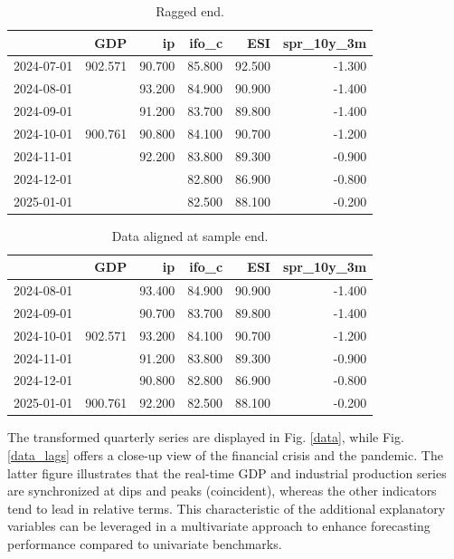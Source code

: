 \documentclass[a4paper]{article}
\begin{document}
\begin{table}[ht]
\centering
\begin{tabular}{rrrrrr}
  \hline
 & GDP & ip & ifo\_c & ESI & spr\_10y\_3m \\ 
  \hline
2024-07-01 & 902.571 & 90.700 & 85.800 & 92.500 & -1.300 \\ 
  2024-08-01 &  & 93.200 & 84.900 & 90.900 & -1.400 \\ 
  2024-09-01 &  & 91.200 & 83.700 & 89.800 & -1.400 \\ 
  2024-10-01 & 900.761 & 90.800 & 84.100 & 90.700 & -1.200 \\ 
  2024-11-01 &  & 92.200 & 83.800 & 89.300 & -0.900 \\ 
  2024-12-01 &  &  & 82.800 & 86.900 & -0.800 \\ 
  2025-01-01 &  &  & 82.500 & 88.100 & -0.200 \\ 
   \hline
\end{tabular}
\caption{Ragged end.  } 
\label{f_stat}
\end{table}%
\begin{table}[ht]
\centering
\begin{tabular}{rrrrrr}
  \hline
 & GDP & ip & ifo\_c & ESI & spr\_10y\_3m \\ 
  \hline
2024-08-01 &  & 93.400 & 84.900 & 90.900 & -1.400 \\ 
  2024-09-01 &  & 90.700 & 83.700 & 89.800 & -1.400 \\ 
  2024-10-01 & 902.571 & 93.200 & 84.100 & 90.700 & -1.200 \\ 
  2024-11-01 &  & 91.200 & 83.800 & 89.300 & -0.900 \\ 
  2024-12-01 &  & 90.800 & 82.800 & 86.900 & -0.800 \\ 
  2025-01-01 & 900.761 & 92.200 & 82.500 & 88.100 & -0.200 \\ 
   \hline
\end{tabular}
\caption{Data aligned at sample end.} 
\label{f_stat}
\end{table}

The transformed quarterly series are displayed in Fig. \ref{data}, while Fig. \ref{data_lags} offers a close-up view of the financial crisis and the pandemic. The latter figure illustrates that the real-time GDP and industrial production series are synchronized at dips and peaks (coincident), whereas the other indicators tend to lead in relative terms. This characteristic of the additional explanatory variables can be leveraged in a multivariate approach to enhance forecasting performance compared to univariate benchmarks. 
\end{document}
